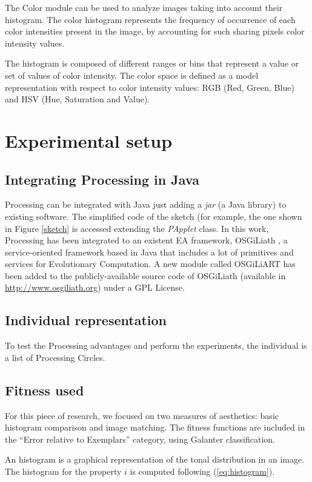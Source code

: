 \documentclass[conference]{IEEEtran}
\begin{document}
The Color module can be used to analyze images taking into account their histogram. The color histogram represents the frequency of occurrence of each color intensities present in the image, by accounting for such sharing pixels color intensity values.

The histogram is composed of different ranges or bins that represent a value or set of values ​​of color intensity. The color space is defined as a model representation with respect to color intensity values: RGB (Red, Green, Blue) and HSV (Hue, Saturation and Value).


\section{Experimental setup}

\subsection{Integrating Processing in Java}
Processing can be integrated with Java just adding a {\em jar} (a Java library) to existing software. The simplified code of the sketch (for example, the one shown in Figure \ref{sketch} is accessed extending the {\em PApplet} class. In this work, Processing has been integrated to an existent EA framework, OSGiLiath \cite{OSGILIATH}, a service-oriented framework based in Java that includes a lot of primitives and services for Evolutionary Computation. A new module called OSGiLiART has been added to the publicly-available source code of OSGiLiath (available in \url{http://www.osgiliath.org}) under a GPL License.

\subsection{Individual representation}

To test the Processing advantages and perform the experiments, the individual is a list of Processing Circles.

\subsection{Fitness used}
For this piece of research, we focused on two measures of aesthetics: basic histogram comparison and image matching. The fitness functions are included in the ``Error relative to Exemplars'' category, using Galanter \cite{galanter2012computational} classification.

An histogram is a graphical representation of the tonal distribution in an image. The histogram for the property $i$ is computed following (\ref{eq:histogram}).
\end{document}
